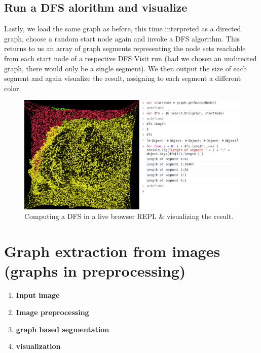 	
	\subsection{Run a DFS alorithm and visualize}
	\label{ssect:run_dfs_visualize}
	
	Lastly, we load the same graph as before, this time interpreted as a directed graph, choose a random start node again and invoke a DFS algorithm. This returns to us an array of graph segments representing the node sets reachable from each start node of a respective DFS Visit run (had we chosen an undirected graph, there would only be a single segment). We then output the size of each segment and again visualize the result, assigning to each segment a different color.
	
	\begin{figure}[H]
		\begin{center}
			\includegraphics [width=1\textwidth] {figures/colorDFSREPL}
			\caption{Computing a DFS in a live browser REPL \& visualizing the result.}
			\label{fig:color_graph_dfs}
		\end{center}
	\end{figure}	


\section{Graph extraction from images (graphs in preprocessing)}
\label{sect:graph_ext}

	\begin{enumerate}
		\item \textbf{Input image}
		\item \textbf{Image preprocessing}
		\item \textbf{graph based segmentation}
		\item \textbf{visualization}
	\end{enumerate}
	
